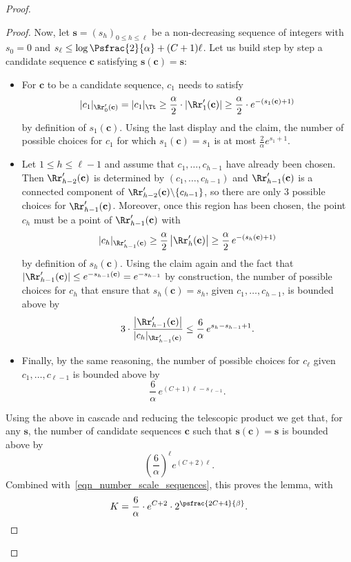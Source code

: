 \begin{proof}
\begin{proof}
Now, let $\mathbf{s}=(s_h)_{0 \leq h \leq \ell}$ be a non-decreasing sequence of integers with $s_0=0$ and $s_{\ell} \leq \log \Psfrac{2}{\alpha} +(C+1)\ell$.
Let us build step by step a candidate sequence $\mathbf{c}$ satisfying $\mathbf{s}(\mathbf{c})=\mathbf{s}$:
\begin{itemize}
\item For $\mathbf{c}$ to be a candidate sequence, $c_1$ needs to satisfy
\begin{align*}
|c_1|_{\Rr'_{0}(\mathbf{c})}=|c_1|_{\Tt} \geq \frac{\alpha}{2}\cdot |\Rr'_{1}(\mathbf{c})| \geq \frac{\alpha}{2}\cdot e^{-(s_1(\mathbf{c})+1)}
\end{align*}
by definition of $s_1(\mathbf{c})$.
Using the last display and the claim, the number of possible choices for $c_1$ for which $s_1(\mathbf{c})=s_1$ is at most $\frac{2}{\alpha} e^{s_1+1}$.
\item Let $1 \leq h \leq \ell-1$ and assume that $c_1, \dots, c_{h-1}$ have already been chosen.
Then $\Rr'_{h-2}(\mathbf{c})$ is determined by $(c_1, \dots, c_{h-1})$ and $\Rr'_{h-1}(\mathbf{c})$ is a connected component of $\Rr'_{h-2}(\mathbf{c}) \backslash \{ c_{h-1} \}$, so there are only $3$ possible choices for $\Rr'_{h-1}(\mathbf{c})$.
Moreover, once this region has been chosen, the point $c_h$ must be a point of $\Rr'_{h-1}(\mathbf{c})$ with
\[
|c_h|_{\Rr'_{h-1}(\mathbf{c})} \geq \frac{\alpha}{2} \left| \Rr_h'(\mathbf{c}) \right| \geq \frac{\alpha}{2}\, e^{-(s_h(\mathbf{c})+1)}
\]
by definition of $s_h(\mathbf{c})$.
Using the claim again and the fact that $|\Rr'_{h-1}(\mathbf{c})| \leq e^{-s_{h-1}(\mathbf{c})}=e^{-s_{h-1}}$ by construction,
the number of possible choices for $c_h$ that ensure that \hbox{$s_h(\mathbf{c})=s_h$}, given $c_1, \dots, c_{h-1}$, is bounded above by
\[
3 \cdot \frac{\left| \Rr'_{h-1}(\mathbf{c}) \right|}{|c_h|_{\Rr'_{h-1}(\mathbf{c})}} \leq \frac{6}{\alpha}\, e^{s_h-s_{h-1}+1}.
\]
\item Finally, by the same reasoning, the number of possible choices for $c_{\ell}$ given $c_1, \dots, c_{\ell-1}$ is bounded above by
\[ \frac{6}{\alpha}\, e^{(C+1)\ell-s_{\ell-1}}.\]
\end{itemize}
Using the above in cascade and reducing the telescopic product we get that, for any $\mathbf{s}$, the number of candidate sequences $\mathbf{c}$ such that $\mathbf{s}(\mathbf{c})=\mathbf{s}$ is bounded above by
\[
\left( \frac{6}{\alpha} \right)^{\ell} e^{(C+2)\ell}.
\]
Combined with~\eqref{eqn_number_scale_sequences}, this proves the lemma, with
\begin{equation}\label{eq:formula for K}
K=\frac{6}{\alpha} \cdot e^{C+2} \cdot 2^{\psfrac{2C+4}{\beta}}.\qedhere
\end{equation}
\end{proof}


\end{proof}
